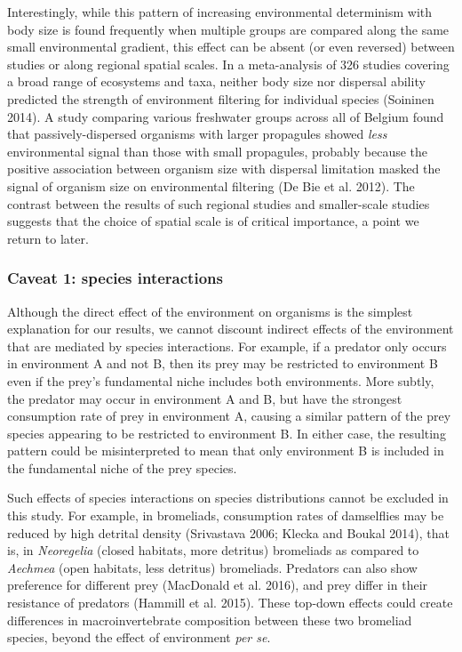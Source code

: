 \documentclass[12pt,]{article}
\begin{document}
Interestingly, while this pattern of increasing environmental
determinism with body size is found frequently when multiple groups are
compared along the same small environmental gradient, this effect can be
absent (or even reversed) between studies or along regional spatial
scales. In a meta-analysis of 326 studies covering a broad range of
ecosystems and taxa, neither body size nor dispersal ability predicted
the strength of environment filtering for individual species (Soininen
2014). A study comparing various freshwater groups across all of Belgium
found that passively-dispersed organisms with larger propagules showed
\emph{less} environmental signal than those with small propagules,
probably because the positive association between organism size with
dispersal limitation masked the signal of organism size on environmental
filtering (De Bie et al. 2012). The contrast between the results of such
regional studies and smaller-scale studies suggests that the choice of
spatial scale is of critical importance, a point we return to later.

\subsubsection{Caveat 1: species
interactions}\label{caveat-1-species-interactions}

Although the direct effect of the environment on organisms is the
simplest explanation for our results, we cannot discount indirect
effects of the environment that are mediated by species interactions.
For example, if a predator only occurs in environment A and not B, then
its prey may be restricted to environment B even if the prey's
fundamental niche includes both environments. More subtly, the predator
may occur in environment A and B, but have the strongest consumption
rate of prey in environment A, causing a similar pattern of the prey
species appearing to be restricted to environment B. In either case, the
resulting pattern could be misinterpreted to mean that only environment
B is included in the fundamental niche of the prey species.

Such effects of species interactions on species distributions cannot be
excluded in this study. For example, in bromeliads, consumption rates of
damselflies may be reduced by high detrital density (Srivastava 2006;
Klecka and Boukal 2014), that is, in \emph{Neoregelia} (closed habitats,
more detritus) bromeliads as compared to \emph{Aechmea} (open habitats,
less detritus) bromeliads. Predators can also show preference for
different prey (MacDonald et al. 2016), and prey differ in their
resistance of predators (Hammill et al. 2015). These top-down effects
could create differences in macroinvertebrate composition between these
two bromeliad species, beyond the effect of environment \emph{per se}.
\end{document}

